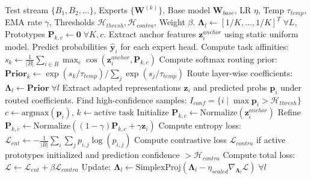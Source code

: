 \documentclass{article}
\theoremstyle{plain}
\theoremstyle{definition}
\theoremstyle{remark}
\begin{document}
\begin{algorithm}[tb]
   \caption{Self-Refining Calibration-Free Prototype Alignment (SR-CPA)}
   \label{alg:srcpa}
\begin{algorithmic}[1]
    Test stream $\{B_1, B_2, \dots\}$, Experts $\{\boldsymbol{W}^{(k)}\}$, Base model $\boldsymbol{W}_{base}$, LR $\eta$, Temp $\tau_{temp}$, EMA rate $\gamma$, Thresholds $\mathcal{H}_{thresh}, \mathcal{H}_{contra}$, Weight $\beta$.
    $\boldsymbol{\Lambda}_l \leftarrow [1/K, \dots, 1/K]^T \;\forall L$, Prototypes $\boldsymbol{P}_{k,c} \leftarrow \boldsymbol{0} \;\forall K, c$.
   \STATE Extract anchor features $\boldsymbol{z}_i^{anchor}$ using static uniform model.
   \STATE Predict probabilities $\boldsymbol{\hat{y}}_i$ for each expert head.
   \STATE Compute task affinities: $s_k \leftarrow \frac{1}{|B|} \sum_{i \in B} \max_c \cos\left(\boldsymbol{z}_i^{anchor}, \boldsymbol{P}_{k,c}\right)$
   \STATE Compute softmax routing prior:
   \STATE \quad $\textbf{Prior}_k \leftarrow \exp(s_k / \tau_{temp}) / \sum_j \exp(s_j / \tau_{temp})$
   \STATE Route layer-wise coefficients: $\boldsymbol{\Lambda}_l \leftarrow \textbf{Prior} \;\forall l$
   \STATE Extract adapted representations $\boldsymbol{z}_i$ and predicted probs $\boldsymbol{p}_i$ under routed coefficients.
   \STATE Find high-confidence samples: $I_{conf} = \{i \mid \max \boldsymbol{p}_i > \mathcal{H}_{thresh}\}$
   \STATE $c \leftarrow \text{argmax}(\boldsymbol{p}_i)$, $k \leftarrow \text{active task}$
   \STATE Initialize $\boldsymbol{P}_{k,c} \leftarrow \text{Normalize}(\boldsymbol{z}_i^{anchor})$
   \ELSE
   \STATE Refine $\boldsymbol{P}_{k,c} \leftarrow \text{Normalize}\left((1-\gamma)\boldsymbol{P}_{k,c} + \gamma \boldsymbol{z}_i\right)$
   \ENDIF
   \ENDFOR
   \ENDIF
   \STATE Compute entropy loss: $\mathcal{L}_{ent} \leftarrow -\frac{1}{|B|} \sum_i \sum_j p_{i,j} \log(p_{i,j})$
   \STATE Compute contrastive loss $\mathcal{L}_{contra}$ if active prototypes initialized and prediction confidence $> \mathcal{H}_{contra}$
   \STATE Compute total loss: $\mathcal{L} \leftarrow \mathcal{L}_{ent} + \beta \mathcal{L}_{contra}$
   \STATE Update: $\boldsymbol{\Lambda}_l \leftarrow \text{SimplexProj}\left(\boldsymbol{\Lambda}_l - \eta_{scaled} \nabla_{\boldsymbol{\Lambda}_l} \mathcal{L}\right) \;\forall l$
   \ENDFOR
\end{algorithmic}
\end{algorithm}
\end{document}
